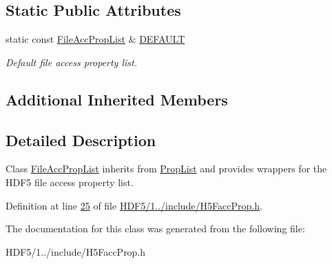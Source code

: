 \subsection*{Static Public Attributes}
\begin{DoxyCompactItemize}
\item 
\mbox{\label{class_h5_1_1_file_acc_prop_list_a866e7c16e8840c67a194f3bef8501e48}} 
static const \hyperlink{class_h5_1_1_file_acc_prop_list}{File\+Acc\+Prop\+List} \& \hyperlink{class_h5_1_1_file_acc_prop_list_a866e7c16e8840c67a194f3bef8501e48}{D\+E\+F\+A\+U\+LT}
\begin{DoxyCompactList}\small\item\em Default file access property list. \end{DoxyCompactList}\end{DoxyCompactItemize}
\subsection*{Additional Inherited Members}


\subsection{Detailed Description}
Class \hyperlink{class_h5_1_1_file_acc_prop_list}{File\+Acc\+Prop\+List} inherits from \hyperlink{class_h5_1_1_prop_list}{Prop\+List} and provides wrappers for the H\+D\+F5 file access property list. 

Definition at line \hyperlink{_h_d_f5_21_810_81_2include_2_h5_facc_prop_8h_source_l00025}{25} of file \hyperlink{_h_d_f5_21_810_81_2include_2_h5_facc_prop_8h_source}{H\+D\+F5/1../include/\+H5\+Facc\+Prop.\+h}.



The documentation for this class was generated from the following file\+:\begin{DoxyCompactItemize}
\item 
H\+D\+F5/1../include/\+H5\+Facc\+Prop.\+h\end{DoxyCompactItemize}
